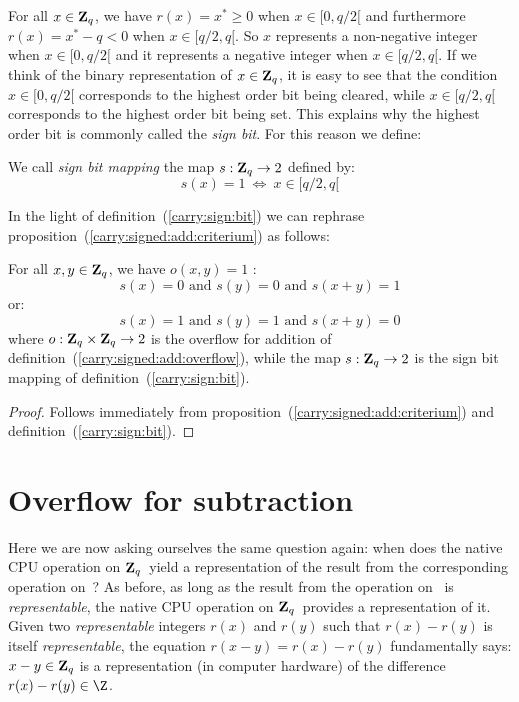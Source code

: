 \documentclass{article}
\newcommand{\zq}{\mbox{${\bf Z}_{q}$}}
\begin{document}
For all $x\in\zq$, we have $r(x)=x^{*}\geq 0$ when $x\in[0,q/2[$ 
and furthermore $r(x)=x^{*}-q < 0$ when $x\in[q/2,q[$. So $x$ represents a 
non-negative integer when $x\in[0,q/2[$ and it represents a 
negative integer when $x\in[q/2,q[$. If we think of the binary
representation of $x\in\zq$, it is easy to see that the condition
$x\in[0,q/2[$ corresponds to the highest order bit being cleared,
while $x\in[q/2,q[$ corresponds to the highest order bit being set.
This explains why the highest order bit is commonly called 
the {\em sign bit}. For this reason we define:

\begin{defin}\label{carry:sign:bit}
  We call {\em sign bit mapping} the map $s:\zq\rightarrow 2$ defined by:
    \[
      s(x) = 1\ \Leftrightarrow\ x\in[q/2,q[
    \]
\end{defin}

In the light of definition~(\ref{carry:sign:bit}) we can rephrase 
proposition~(\ref{carry:signed:add:criterium}) as follows:
\begin{prop}\label{carry:signed:add:criterium:2}
  For all $x,y\in\zq$, we have $o(x,y)=1$ \ifand:
  \[
    s(x)=0\mbox{\ and\ }s(y)=0\mbox{\ and\ }s(x+y)=1
  \]
or:
  \[
    s(x)=1\mbox{\ and\ }s(y)=1\mbox{\ and\ }s(x+y)=0
  \]
where $o:\zq\times\zq\rightarrow 2$ is the overflow for addition of 
  definition~(\ref{carry:signed:add:overflow}), while the map 
  $s:\zq\rightarrow 2$ is the sign bit mapping of 
  definition~(\ref{carry:sign:bit}).
\end{prop}
\begin{proof}
  Follows immediately from proposition~(\ref{carry:signed:add:criterium})
  and definition~(\ref{carry:sign:bit}).
\end{proof}

\section{Overflow for subtraction}
Here we are now asking ourselves the same question again: when does the
native CPU operation on \zq\ yield a representation of the result from
the corresponding operation on \Z\,? As before, as long as the result 
from the operation on \Z\ is {\em representable}, the native CPU operation 
on \zq\ provides a representation of it. Given two {\em representable}
integers $r(x)$ and $r(y)$ such that $r(x)-r(y)$ is itself 
{\em representable}, the equation $r(x-y)=r(x)-r(y)$ fundamentally says:
$x-y\in\zq$ is a representation
(in computer hardware) of the difference $r(x)-r(y)\in\Z$. 
\end{document}
